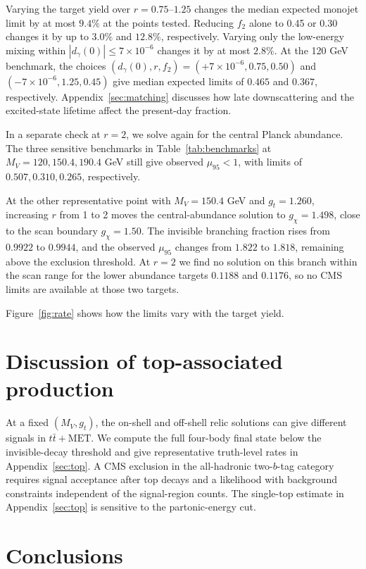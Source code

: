 \documentclass[aps,prd,reprint,superscriptaddress,longbibliography,floatfix]{revtex4-2}
\begin{document}
Varying the target yield over $r=0.75$--$1.25$ changes the median expected monojet limit by at most $9.4\%$ at the points tested. Reducing $f_2$ alone to 0.45 or 0.30 changes it by up to $3.0\%$ and $12.8\%$, respectively. Varying only the low-energy mixing within $|d_\gamma(0)|\le7\times10^{-6}$ changes it by at most $2.8\%$. At the 120 GeV benchmark, the choices $(d_\gamma(0),r,f_2)=(+7\times10^{-6},0.75,0.50)$ and $(-7\times10^{-6},1.25,0.45)$ give median expected limits of $0.465$ and $0.367$, respectively. Appendix~\ref{sec:matching} discusses how late downscattering and the excited-state lifetime affect the present-day fraction.

In a separate check at $r=2$, we solve again for the central Planck abundance. The three sensitive benchmarks in Table~\ref{tab:benchmarks} at $M_V=120,150.4,190.4$ GeV still give observed $\mu_{95}<1$, with limits of $0.507,0.310,0.265$, respectively.

At the other representative point with $M_V=150.4$ GeV and $g_t=1.260$, increasing $r$ from 1 to 2 moves the central-abundance solution to $g_\chi=1.498$, close to the scan boundary $g_\chi=1.50$. The invisible branching fraction rises from $0.9922$ to $0.9944$, and the observed $\mu_{95}$ changes from $1.822$ to $1.818$, remaining above the exclusion threshold. At $r=2$ we find no solution on this branch within the scan range for the lower abundance targets $0.1188$ and $0.1176$, so no CMS limits are available at those two targets.

Figure~\ref{fig:rate} shows how the limits vary with the target yield.

\section{Discussion of top-associated production}
\label{sec:discussion}

At a fixed $(M_V,g_t)$, the on-shell and off-shell relic solutions can give different signals in $t\bar t+\mathrm{MET}$. We compute the full four-body final state below the invisible-decay threshold and give representative truth-level rates in Appendix~\ref{sec:top}. A CMS exclusion in the all-hadronic two-$b$-tag category requires signal acceptance after top decays and a likelihood with background constraints independent of the signal-region counts. The single-top estimate in Appendix~\ref{sec:top} is sensitive to the partonic-energy cut. \cite{cmstop}

\section{Conclusions}
\label{sec:conclusions}
\end{document}
